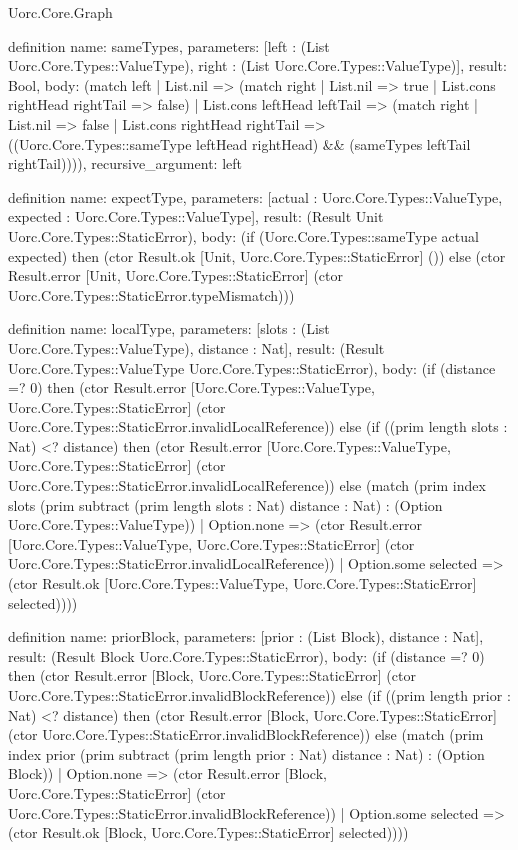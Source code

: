 \begin{lexlean}{Uorc.Core.Graph}
\begin{semanticmodule}
definition{
  name: sameTypes,
  parameters: [left : (List Uorc.Core.Types::ValueType), right : (List Uorc.Core.Types::ValueType)],
  result: Bool,
  body: (match left
    | List.nil => (match right | List.nil => true | List.cons rightHead rightTail => false)
    | List.cons leftHead leftTail => (match right
      | List.nil => false
      | List.cons rightHead rightTail => ((Uorc.Core.Types::sameType leftHead rightHead) && (sameTypes leftTail rightTail)))),
  recursive_argument: left
}

definition{
  name: expectType,
  parameters: [actual : Uorc.Core.Types::ValueType, expected : Uorc.Core.Types::ValueType],
  result: (Result Unit Uorc.Core.Types::StaticError),
  body: (if (Uorc.Core.Types::sameType actual expected) then (ctor Result.ok [Unit, Uorc.Core.Types::StaticError] ()) else (ctor Result.error [Unit, Uorc.Core.Types::StaticError] (ctor Uorc.Core.Types::StaticError.typeMismatch)))
}

definition{
  name: localType,
  parameters: [slots : (List Uorc.Core.Types::ValueType), distance : Nat],
  result: (Result Uorc.Core.Types::ValueType Uorc.Core.Types::StaticError),
  body: (if (distance =? 0) then (ctor Result.error [Uorc.Core.Types::ValueType, Uorc.Core.Types::StaticError] (ctor Uorc.Core.Types::StaticError.invalidLocalReference)) else (if ((prim length slots : Nat) <? distance) then (ctor Result.error [Uorc.Core.Types::ValueType, Uorc.Core.Types::StaticError] (ctor Uorc.Core.Types::StaticError.invalidLocalReference)) else (match (prim index slots (prim subtract (prim length slots : Nat) distance : Nat) : (Option Uorc.Core.Types::ValueType))
    | Option.none => (ctor Result.error [Uorc.Core.Types::ValueType, Uorc.Core.Types::StaticError] (ctor Uorc.Core.Types::StaticError.invalidLocalReference))
    | Option.some selected => (ctor Result.ok [Uorc.Core.Types::ValueType, Uorc.Core.Types::StaticError] selected))))
}

definition{
  name: priorBlock,
  parameters: [prior : (List Block), distance : Nat],
  result: (Result Block Uorc.Core.Types::StaticError),
  body: (if (distance =? 0) then (ctor Result.error [Block, Uorc.Core.Types::StaticError] (ctor Uorc.Core.Types::StaticError.invalidBlockReference)) else (if ((prim length prior : Nat) <? distance) then (ctor Result.error [Block, Uorc.Core.Types::StaticError] (ctor Uorc.Core.Types::StaticError.invalidBlockReference)) else (match (prim index prior (prim subtract (prim length prior : Nat) distance : Nat) : (Option Block))
    | Option.none => (ctor Result.error [Block, Uorc.Core.Types::StaticError] (ctor Uorc.Core.Types::StaticError.invalidBlockReference))
    | Option.some selected => (ctor Result.ok [Block, Uorc.Core.Types::StaticError] selected))))
}


\end{semanticmodule}
\end{lexlean}
